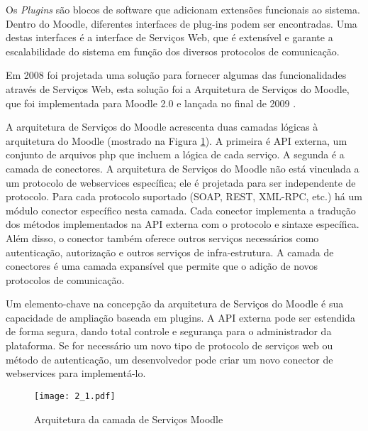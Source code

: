 Os \textit{Plugins} são blocos de software que adicionam extensões funcionais ao sistema. Dentro do Moodle, diferentes interfaces de plug-ins podem ser encontradas. Uma destas interfaces é a interface de Serviços Web, que é extensível e garante a escalabilidade do sistema em função dos diversos protocolos de comunicação.

Em 2008 foi projetada uma solução para fornecer algumas das funcionalidades através de Serviços Web, esta solução foi a Arquitetura de Serviços do Moodle, que foi implementada para Moodle 2.0 e lançada no final de 2009 \cite{article:alier}. 

A arquitetura de Serviços do Moodle acrescenta duas camadas lógicas à arquitetura do Moodle (mostrado na Figura \ref{moodle-arq}). A primeira é API externa, um conjunto de arquivos php que incluem a lógica de cada serviço. A segunda é a camada de conectores. A arquitetura de Serviços do Moodle não está vinculada a um protocolo de webservices específica; ele é projetada para ser independente de protocolo. Para cada protocolo suportado (SOAP, REST, XML-RPC, etc.) há um módulo conector específico nesta camada. Cada conector implementa a tradução dos métodos implementados na API externa com o protocolo e sintaxe específica. Além disso, o conector também oferece outros serviços necessários como autenticação, autorização e outros serviços de infra-estrutura. A camada de conectores é uma camada expansível que permite que o adição de novos protocolos de comunicação.

Um elemento-chave na concepção da arquitetura de Serviços do Moodle é sua capacidade de ampliação baseada em plugins. A API externa pode ser estendida de forma segura, dando total controle e segurança para o administrador da plataforma. Se for necessário um novo tipo de protocolo de serviços web ou método de autenticação, um desenvolvedor pode criar um novo conector de webservices para implementá-lo.

\begin{figure}[H]
\centering
\texttt{[image: 2\_1.pdf]}
    \caption{Arquitetura da camada de Serviços Moodle \cite{article:alier}}
    \label{moodle-arq}%
\end{figure}


